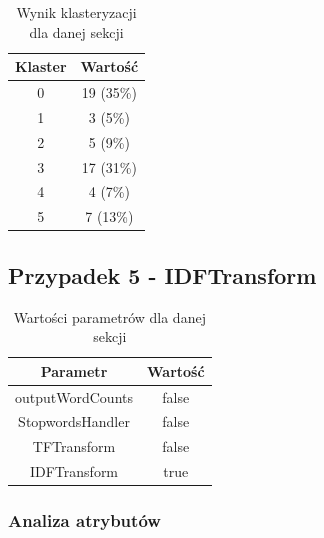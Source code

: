\documentclass[../EDI_Task2_Karwowski_Kowalewski.tex]{subfiles}
\begin{document}
{{{            \begin{table}[!htbp]
                \small
                \centering
                \begin{tabular}{|c|c|}
                    \hline
                    Klaster & Wartość \\ \hline
                    0   &  19 (35\%) \\
                    1   &   3 (5\%) \\
                    2   &   5 (9\%) \\
                    3   &  17 (31\%) \\
                    4   &   4 (7\%) \\
                    5   &   7 (13\%) \\ \hline
                \end{tabular}
                \caption{Wynik klasteryzacji dla danej sekcji}
            \end{table}
            \FloatBarrier
        }
    }

    \subsection{Przypadek 5 - IDFTransform} {

        \begin{table}[!htbp]
            \small
            \centering
            \begin{tabular}{|c|c|}
                \hline
                Parametr & Wartość \\ \hline
                outputWordCounts & false \\ \hline
                StopwordsHandler & false \\ \hline
                TFTransform & false \\ \hline
                IDFTransform & true \\ \hline
            \end{tabular}
            \caption{Wartości parametrów dla danej sekcji}
        \end{table}
        \FloatBarrier

        \subsubsection{Analiza atrybutów} {

}}}
\end{document}

